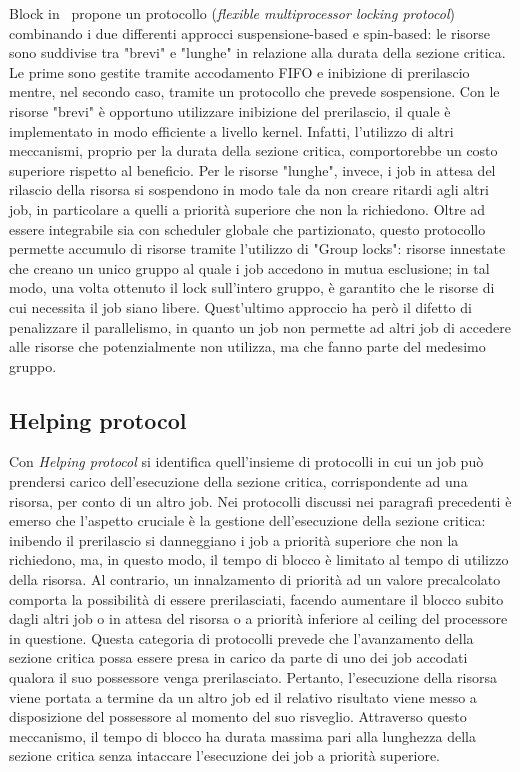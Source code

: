 Block in~\cite{Block:2007:FRL:1306877.1307316} propone un protocollo (\textit{flexible multiprocessor locking protocol}) combinando i due differenti approcci suspensione-based e spin-based: le risorse sono suddivise tra "brevi" e "lunghe" in relazione alla durata della sezione critica. Le prime sono gestite tramite accodamento FIFO e inibizione di prerilascio mentre, nel secondo caso, tramite un protocollo che prevede sospensione. Con le risorse "brevi" è opportuno utilizzare inibizione del prerilascio, il quale è implementato in modo efficiente a livello kernel. Infatti, l'utilizzo di altri meccanismi, proprio per la durata della sezione critica, comportorebbe un costo superiore rispetto al beneficio. Per le risorse "lunghe", invece, i job in attesa del rilascio della risorsa si sospendono in modo tale da non creare ritardi agli altri job, in particolare a quelli a priorità superiore che non la richiedono. Oltre ad essere integrabile sia con scheduler globale che partizionato, questo protocollo permette accumulo di risorse tramite l'utilizzo di "Group locks": risorse innestate che creano un unico gruppo al quale i job accedono in mutua esclusione; in tal modo, una volta ottenuto il lock sull'intero gruppo, è garantito che le risorse di cui necessita il job siano libere. Quest'ultimo approccio ha però il difetto di penalizzare il parallelismo, in quanto un job non permette ad altri job di accedere alle risorse che potenzialmente non utilizza, ma che fanno parte del medesimo gruppo.\\

\subsection{Helping protocol}
\label{sec:lockProtocols.help}

Con \textit{Helping protocol} si identifica quell'insieme di protocolli in cui un job può prendersi carico dell'esecuzione della sezione critica, corrispondente ad una risorsa, per conto di un altro job. Nei protocolli discussi nei paragrafi precedenti è emerso che l'aspetto cruciale è la gestione dell'esecuzione della sezione critica: inibendo il prerilascio si danneggiano i job a priorità superiore che non la richiedono, ma, in questo modo, il tempo di blocco è limitato al tempo di utilizzo della risorsa. Al contrario, un innalzamento di priorità ad un valore precalcolato comporta la possibilità di essere prerilasciati, facendo aumentare il blocco subito dagli altri job o in attesa del risorsa o a priorità inferiore al ceiling del processore in questione. Questa categoria di protocolli prevede che l'avanzamento della sezione critica possa essere presa in carico da parte di uno dei job accodati qualora il suo possessore venga prerilasciato. Pertanto, l'esecuzione della risorsa viene portata a termine da un altro job ed il relativo risultato viene messo a disposizione del possessore al momento del suo risveglio. Attraverso questo meccanismo, il tempo di blocco ha durata massima pari alla lunghezza della sezione critica senza intaccare l'esecuzione dei job a priorità superiore.\\

